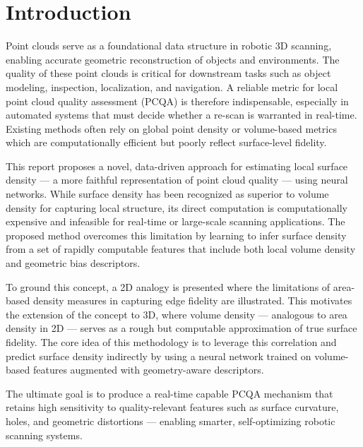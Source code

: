 \section{Introduction}
Point clouds serve as a foundational data structure in robotic 3D scanning, enabling accurate geometric reconstruction of objects and environments. The quality of these point clouds is critical for downstream tasks such as object modeling, inspection, localization, and navigation. A reliable metric for local point cloud quality assessment (PCQA) is therefore indispensable, especially in automated systems that must decide whether a re-scan is warranted in real-time. Existing methods often rely on global point density or volume-based metrics which are computationally efficient but poorly reflect surface-level fidelity.

This report proposes a novel, data-driven approach for estimating local surface density — a more faithful representation of point cloud quality — using neural networks. While surface density has been recognized as superior to volume density for capturing local structure, its direct computation is computationally expensive and infeasible for real-time or large-scale scanning applications. The proposed method overcomes this limitation by learning to infer surface density from a set of rapidly computable features that include both local volume density and geometric bias descriptors.

To ground this concept, a 2D analogy is presented where the limitations of area-based density measures in capturing edge fidelity are illustrated. This motivates the extension of the concept to 3D, where volume density — analogous to area density in 2D — serves as a rough but computable approximation of true surface fidelity. The core idea of this methodology is to leverage this correlation and predict surface density indirectly by using a neural network trained on volume-based features augmented with geometry-aware descriptors.

The ultimate goal is to produce a real-time capable PCQA mechanism that retains high sensitivity to quality-relevant features such as surface curvature, holes, and geometric distortions — enabling smarter, self-optimizing robotic scanning systems.